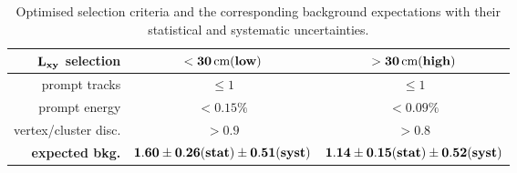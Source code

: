 \begin{table}[htbp]
\centering
\caption{Optimised selection criteria and the corresponding background expectations with their statistical and systematic uncertainties.\label{tab:background}}
\vspace{0.1cm}
\begin{tabular}{r|c|c}
$\bf L_{xy}$ \bf selection &\bf  $\bf <30\,\text{cm} (low)$ & \bf  $\bf >30\,\text{cm} (high)$ \\
\hline
prompt tracks & $\leq1$ & $\leq1$ \\
prompt energy & $<0.15\%$ & $<0.09\%$ \\
vertex/cluster disc. & $>0.9$ & $>0.8$  \\
\hline
\bf expected bkg. & $\bf 1.60\pm0.26(stat)\pm0.51(syst)$ & $\bf 1.14\pm0.15(stat)\pm0.52(syst)$ \\
\end{tabular}
\end{table}

